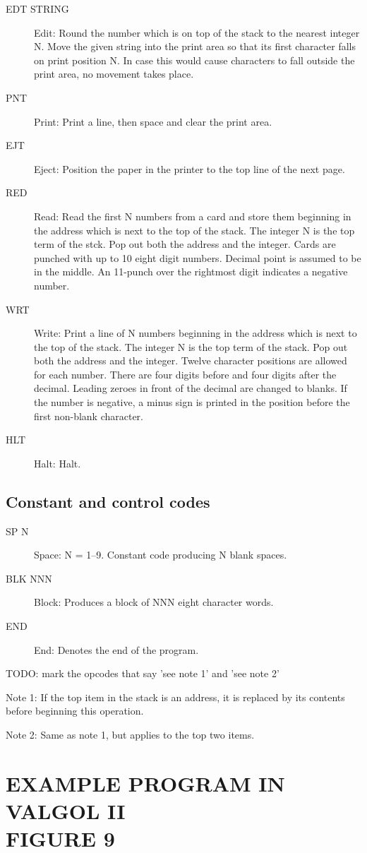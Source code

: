 \documentclass[twocolumn]{article}
\begin{document}
\begin{description}
\item[EDT STRING] Edit: Round the number which is on top of the stack to the
nearest integer N. Move the given string into the print area so that its first
character falls on print position N.
In case this would cause characters to fall outside the print area, no movement
takes place.
\item[PNT] Print: Print a line, then space and clear the print area.
\item[EJT] Eject: Position the paper in the printer to the top line of the next page.
\item[RED] Read: Read the first N numbers from a card and store them beginning
in the address which is next to the top of the stack.
The integer N is the top term of the stck.
Pop out both the address and the integer.
Cards are punched with up to 10 eight digit numbers.
Decimal point is assumed to be in the middle.
An 11-punch over the rightmost digit indicates a negative number.
\item[WRT] Write: Print a line of N numbers beginning in the address which
is next to the top of the stack.
The integer N is the top term of the stack.
Pop out both the address and the integer.
Twelve character positions are allowed for each number.
There are four digits before and four digits after the decimal.
Leading zeroes in front of the decimal are changed to blanks.
If the number is negative, a minus sign is printed in the position before
the first non-blank character.
\item[HLT] Halt: Halt.
\end{description}
\subsection{Constant and control codes}
\begin{description}
\item[SP  N] Space: N = 1--9. Constant code producing N blank spaces.
\item[BLK NNN] Block: Produces a block of NNN eight character words.
\item[END] End: Denotes the end of the program.
\end{description}

TODO: mark the opcodes that say 'see note 1' and 'see note 2'

Note 1: If the top item in the stack is an address, it is replaced by its
contents before beginning this operation.

Note 2: Same as note 1, but applies to the top two items.

\section{EXAMPLE PROGRAM IN VALGOL II\\FIGURE 9}

\end{document}
